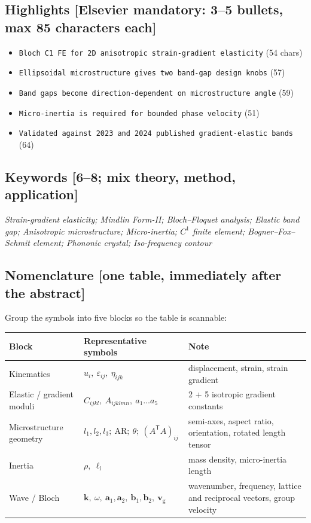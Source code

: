 \documentclass[11pt,a4paper]{article}
\newcommand{\bp}[1]{\textcolor{accent}{\textsf{\footnotesize [#1]}}}
\begin{document}
\subsection{Highlights \bp{Elsevier mandatory: 3--5 bullets, max 85 characters each}}

\begin{itemize}[label=\textbullet]
\item \texttt{Bloch C1 FE for 2D anisotropic strain-gradient elasticity} \hfill (54 chars)
\item \texttt{Ellipsoidal microstructure gives two band-gap design knobs} \hfill (57)
\item \texttt{Band gaps become direction-dependent on microstructure angle} \hfill (59)
\item \texttt{Micro-inertia is required for bounded phase velocity} \hfill (51)
\item \texttt{Validated against 2023 and 2024 published gradient-elastic bands} \hfill (64)
\end{itemize}

\subsection{Keywords \bp{6--8; mix theory, method, application}}

\emph{Strain-gradient elasticity; Mindlin Form-II; Bloch--Floquet analysis; Elastic band gap;
Anisotropic microstructure; Micro-inertia; $C^1$ finite element; Bogner--Fox--Schmit element;
Phononic crystal; Iso-frequency contour}

\subsection{Nomenclature \bp{one table, immediately after the abstract}}

Group the symbols into five blocks so the table is scannable:

{\small
\begin{tabularx}{\textwidth}{@{}L{2.9cm} L{7.2cm} Y@{}}
\toprule
Block & Representative symbols & Note \\
\midrule
Kinematics & $u_i,\ \varepsilon_{ij},\ \eta_{ijk}$ & displacement, strain, strain gradient \\
Elastic / gradient moduli & $C_{ijkl},\ A_{ijklmn},\ a_1\ldots a_5$ & 2 + 5 isotropic gradient constants \\
Microstructure geometry & $l_1,l_2,l_3;\ \mathrm{AR};\ \theta;\ (A^{\mathsf T}\!A)_{ij}$ & semi-axes, aspect ratio, orientation, rotated length tensor \\
Inertia & $\rho,\ \ell_{\mathrm i}$ & mass density, micro-inertia length \\
Wave / Bloch & $\bm k,\ \omega,\ \bm a_1,\bm a_2,\ \bm b_1,\bm b_2,\ \bm v_{\mathrm g}$ & wavenumber, frequency, lattice and reciprocal vectors, group velocity \\
\bottomrule
\end{tabularx}
}
\end{document}
